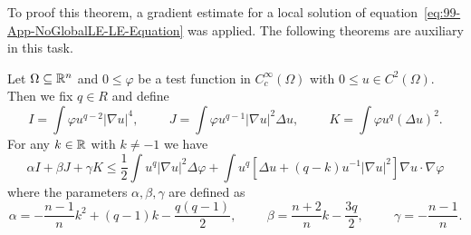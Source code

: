 To proof this theorem, a gradient estimate for a local solution of equation~\eqref{eq:99-App-NoGlobalLE-LE-Equation} was applied.
The following theorems are auxiliary in this task.
\begin{lemma}
	\label{lem:99-App-NoGlobalLE-Lemma1}
	Let $\Omega\subseteq\mathbb{R}^n$ and $0\leq\varphi$ be a test function in $C_c^\infty(\Omega)$ with $0\leq u\in C^2(\Omega)$.
	Then we fix $q\in R$ and define
	\begin{equation}
		I=\int\varphi u^{q-2}\left|\nabla u\right|^4, \hspace{1cm} J=\int\varphi u^{q-1}\left|\nabla u\right|^2\Delta u, \hspace{1cm} K=\int \varphi u^q(\Delta u)^2.
		\label{eq:99-App-NoGlobalLE-Def-IJK}
	\end{equation}
	For any $k\in\mathbb{R}$ with $k\neq -1$ we have
	\begin{equation}
		\alpha I + \beta J + \gamma K \leq \frac{1}{2}\int u^q\left|\nabla u\right|^2\Delta\varphi + \int u^q\left[\Delta u + (q-k)u^{-1}\left|\nabla u\right|^2\right]\nabla u\cdot\nabla\varphi
		\label{eq:99-App-NoGlobalLE-Ineq-IJK}
	\end{equation}
	where the parameters $\alpha, \beta, \gamma$ are defined as
	\begin{equation}
		\alpha=-\frac{n-1}{n}k^2 + (q-1)k-\frac{q(q-1)}{2}, \hspace{1cm} \beta=\frac{n+2}{n}k-\frac{3q}{2}, \hspace{1cm} \gamma = -\frac{n-1}{n}.
		\label{eq:99-App-NoGlobalLE-Def-Alph-Bet-Gam}
	\end{equation}
\end{lemma}
